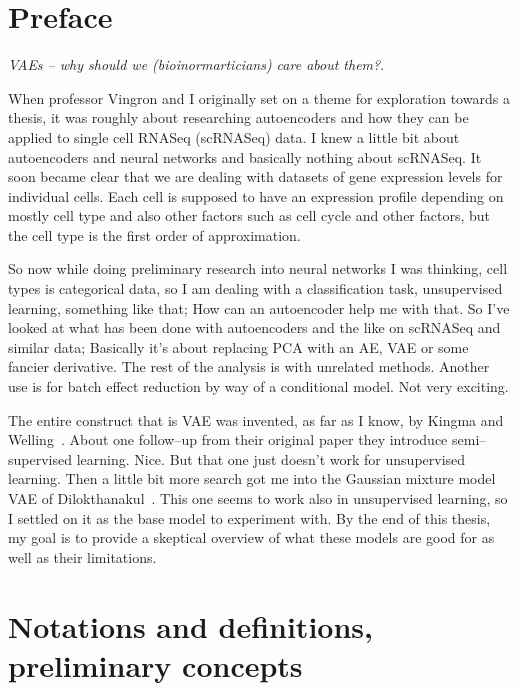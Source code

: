 \documentclass[11pt, a4paper]{report}
\theoremstyle{plain}
\theoremstyle{definition}
\theoremstyle{remark}
\begin{document}

\listoffigures

\tableofcontents


\chapter*{Preface}

\emph{VAEs -- why should we (bioinormarticians) care about them?}.

When professor Vingron and I originally set on a theme for exploration towards a thesis, 
it was roughly about researching autoencoders and how they can be applied 
to single cell RNASeq (scRNASeq) data. I knew a little bit about autoencoders
and neural networks and basically nothing about scRNASeq.
It soon became clear that we are dealing with datasets of gene expression
levels for individual cells. Each cell is supposed to have an expression profile
depending on mostly cell type and also other factors such as cell cycle and
other factors, but the cell type is the first order of approximation.

So now while doing preliminary research into neural networks I was thinking,
cell types is categorical data, so I am dealing with
a classification task, unsupervised learning, something like that; How can an
autoencoder help me with that. 
So I've looked at what has been done with autoencoders and the like on scRNASeq and
similar data; Basically it's about replacing PCA with an AE, VAE or some fancier 
derivative. The rest of the analysis is with unrelated methods. Another use is
for batch effect reduction by way of a conditional model.
Not very exciting.

The entire construct that is VAE was invented, as far as I know, by Kingma and
Welling~\cite{kingma2013auto,kingma2014semi,}. About one follow--up from
their original paper they introduce semi--supervised learning. Nice.
But that one just doesn't work for unsupervised learning.
Then a little bit more search got me into the Gaussian mixture model VAE of
Dilokthanakul~\cite{dilokthanakul2016deep}. This one seems to work also in
unsupervised learning, so I settled on it as the base model to experiment with.
By the end of this thesis, my goal is to provide a skeptical overview of what
these models are good for as well as their limitations.


\chapter{Notations and definitions, preliminary concepts}
\end{document}
